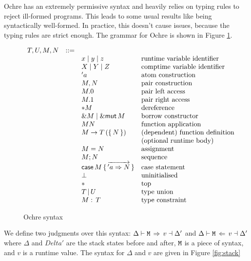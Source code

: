 \documentclass[12pt,twoside]{report}
\begin{document}
Ochre has an extremely permissive syntax and heavily relies on typing rules to reject ill-formed programs. This leads to some usual results like  being syntactically well-formed. In practice, this doesn't cause issues, because the typing rules are strict enough. The grammar for Ochre is shown in Figure \ref{fig:syntax}.

\begin{figure}[H]
  \arraycolsep=1pt %
  \centering

  \vspace{-2ex} %
  \[
  \begin{array}[t]{llll}
    T, U, M, N & ::= & & \\
    && x\mid{}y\mid{}z & \text{runtime variable identifier} \\
    && X\mid{}Y\mid{}Z & \text{comptime variable identifier} \\
    && 'a & \text{atom construction} \\
    && M, N & \text{pair construction} \\
    && M.0 & \text{pair left access} \\
    && M.1 & \text{pair right access} \\
    && *M & \text{dereference} \\
    && \&M \mid \&\kw{mut}\,M & \text{borrow constructor} \\
    && M N & \text{function application} \\
    && M \rightarrow T\,(\{\,N\,\}) & \text{(dependent) function definition} \\
    && & \text{(optional runtime body)}  \\
    && M = N & \text{assignment} \\
    && M; N & \text{sequence} \\
    && \kw{case}\,M\,\{\,\overrightarrow{'a \Rightarrow N}\,\} & \text{case statement} \\
    && \bot & \text{uninitialised} \\
    && * & \text{top} \\
    && T\,|\,U & \text{type union} \\
    && M:\,T & \text{type constraint} \\
  \end{array} %
  \]
\caption{Ochre syntax} %
\label{fig:syntax} %
\end{figure} %

We define two judgments over this syntax: $\Delta \vdash \text{\texttt{M}} \,\Rightarrow\, v \dashv \Delta'$ and $\Delta \vdash \text{\texttt{M}} \,\Leftarrow\, v \dashv \Delta'$ where $\Delta$ and $Delta'$ are the stack states before and after, $\text{\texttt{M}}$ is a piece of syntax, and $v$ is a runtime value. The syntax for $\Delta$ and $v$ are given in Figure \ref{fig:stack}
\end{document}
